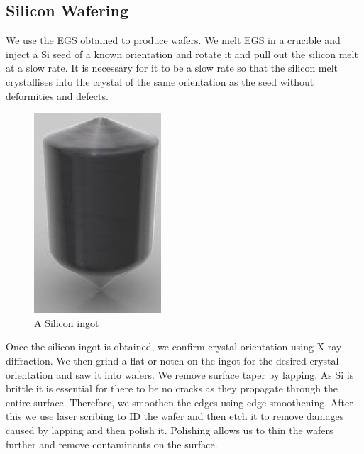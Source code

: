 \subsection{Silicon Wafering }
We use the EGS obtained to produce wafers. We melt EGS in a crucible and inject a Si seed of a known orientation and rotate it and pull out the silicon melt at a slow rate. It is necessary for it to be a slow rate so that the silicon melt crystallises into the crystal of the same orientation as the seed without deformities and defects. 



\begin{figure}[htb]
\centering
\includegraphics[scale=0.4]{./fig2} %
\caption{A Silicon ingot}
\label{3.2} %
\end{figure}

\noindent Once the silicon ingot is obtained, we confirm crystal orientation using X-ray diffraction. We then grind a flat or notch on the ingot for the desired crystal orientation and saw it into wafers. We remove surface taper by lapping. As Si is brittle it is essential for there to be no cracks as they propagate through the entire surface. Therefore, we smoothen the edges using edge smoothening. After this we use laser scribing to ID the wafer and then etch it to remove damages caused by lapping and then polish it. Polishing allows us to thin the wafers further and remove contaminants on the surface.



